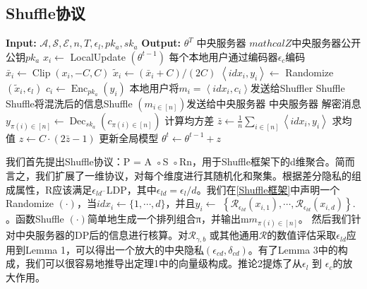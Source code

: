 \subsection{Shuffle协议}
\begin{algorithm}[!htb]
  \caption{$\mathcal{R}_{\gamma, b}:[0,1] \rightarrow[b]$}
  \label{Shuffle框架}
  \begin{algorithmic}[1]
    \footnotesize
    \STATE \textbf{Input:} $\mathcal{A}, \mathcal{S}, \mathcal{E}, n, T, \epsilon_{l}, p k_{a}, s k_{a}$
    \STATE \textbf{Output:} $\theta^{T}$
      \STATE 中央服务器 $mathcal{Z}$中央服务器公开公钥$p k_{a}$
          \STATE $x_{i} \leftarrow$ LocalUpdate $\left(\theta^{t-1}\right)$
          \STATE 每个本地用户通过编码器$\epsilon_{c}$编码
          \STATE $\bar{x}_{i} \leftarrow \operatorname{Clip}\left(x_{i},-C, C\right)$
          \STATE $\tilde{x}_{i} \leftarrow\left(\bar{x}_{i}+C\right) /(2 C)$
          \STATE $\left\langle i d x_{i}, y_{i}\right\rangle \leftarrow$ Randomize $\left(\tilde{x}_{i}, \epsilon_{l}\right)$
          \STATE $c_{i} \leftarrow \operatorname{Enc}_{p k_{a}}\left(y_{i}\right)$
          \STATE 本地用户将$m_{i}=\left\langle i d x_{i}, c_{i}\right\rangle$发送给Shuffler
        \ENDFOR
      \STATE Shuffle
      \STATE Shuffle将混洗后的信息Shuffle $\left(m_{i \in[n]}\right)$发送给中央服务器
      \STATE 中央服务器
      \STATE 解密消息 $y_{\pi(i) \in[n]} \leftarrow \operatorname{Dec}_{s k_{a}}\left(c_{\pi(i) \in[n]}\right)$
      \STATE 计算均方差 $\bar{z} \leftarrow \frac{1}{n} \sum_{i \in[n]}\left\langle i d x_{i}, y_{i}\right\rangle$
      \STATE 求均值 $z \leftarrow C \cdot(2 \bar{z}-1)$
      \STATE 更新全局模型 $\theta^{t} \leftarrow \theta^{t-1}+z$
  \end{algorithmic}
\end{algorithm}

我们首先提出Shuffle协议：P = A ◦S ◦Rn，用于Shuffle框架下的d维聚合。简而言之，我们扩展了一维协议，对每个维度进行其随机化和聚集。根据差分隐私的组成属性，R应该满足$\epsilon_{l d^{-}}$LDP，其中$\epsilon_{l d}=\epsilon_{l} / d$。我们在\ref{Shuffle框架}中声明一个Randomize $(\cdot)$，当$i d x_{i} \leftarrow\{1, \cdots, d\}$，并且$y_{i} \leftarrow$ $\left\{\mathcal{R}_{\epsilon_{l d}}\left(x_{i, 1}\right), \cdots, \mathcal{R}_{\epsilon_{l d}}\left(x_{i, d}\right)\right\} .$。函数Shuffle $(\cdot)$简单地生成一个排列组合π，并输出m$m_{\pi(i) \in[n]}$。
然后我们针对中央服务器的DP后的信息进行核算。对$\mathcal{R}_{\gamma, b}$ 或其他通用$\mathcal{R}$的数值评估采取$\epsilon_{l d}$应用到Lemma 1，可以得出一个放大的中央隐私$\left(\epsilon_{c d}, \delta_{c d}\right)$。有了Lemma 3中的构成，我们可以很容易地推导出定理1中的向量级构成。推论2提炼了从$\epsilon_{l}$ 到 $\epsilon_{c}$的放大作用。

